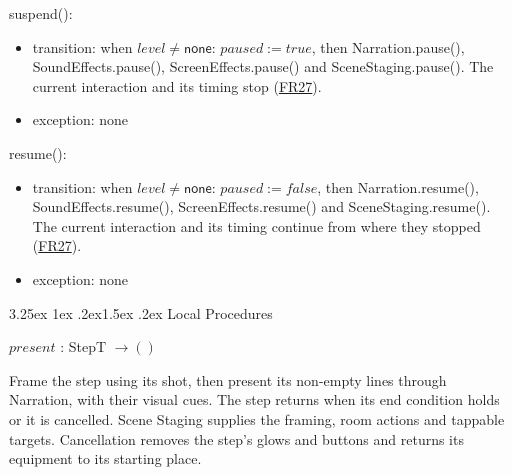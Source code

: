 \documentclass[10pt, titlepage]{article}
\makeatletter
\newcommand{\srsurl}{https://team-hindsight.github.io/ophthamology-game/SRS/SRS.pdf}
\newcommand{\srsitemref}[2]{\href{\srsurl\#nameddest=#1}{#2}}
\renewcommand\paragraph{\@startsection{paragraph}{4}{\z@}%
  {3.25ex \@plus 1ex \@minus .2ex}{1.5ex \@plus .2ex}%
  {\normalfont\normalsize\bfseries}}
\newcommand{\T}[1]{\mathit{#1}}          %
\newcommand{\V}[1]{\mathsf{#1}}          %
\newcommand{\true}{\mathit{true}}
\newcommand{\false}{\mathit{false}}
\makeatother
\begin{document}
\begin{samepage}
\noindent suspend():
\begin{itemize}
\item transition: when $\T{level} \neq \V{none}$: $\T{paused} := \true$,
  then Narration.pause(), SoundEffects.pause(), ScreenEffects.pause() and
  SceneStaging.pause(). The current interaction and its timing stop
  (\srsitemref{FR_Suspend}{FR27}).
\item exception: none
\end{itemize}
\end{samepage}
\par\pagebreak[0]

\begin{samepage}
\noindent resume():
\begin{itemize}
\item transition: when $\T{level} \neq \V{none}$: $\T{paused} := \false$,
  then Narration.resume(), SoundEffects.resume(), ScreenEffects.resume() and
  SceneStaging.resume(). The current interaction and its timing continue
  from where they stopped (\srsitemref{FR_Suspend}{FR27}).
\item exception: none
\end{itemize}
\end{samepage}
\par\pagebreak[0]

\paragraph{Local Procedures}

$\T{present}$ : StepT $\to ()$

Frame the step using its shot, then present its non-empty lines through
Narration, with their visual cues. The step returns when its end condition
holds or it is cancelled. Scene Staging supplies the framing, room actions
and tappable targets. Cancellation removes the step's glows and buttons
and returns its equipment to its starting place.
\end{document}
